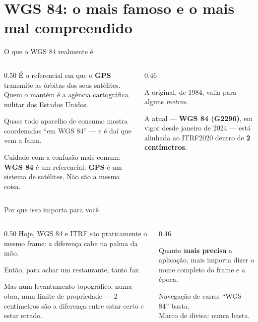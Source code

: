 \documentclass[aspectratio=169,11pt]{beamer}
\newcommand{\bnum}[1]{\textbf{\textcolor{mTeal}{#1}}}
\begin{document}
\section{WGS 84: o mais famoso e o mais mal compreendido}

\begin{frame}{O que o WGS 84 realmente é}
  \begin{columns}[T]
    \begin{column}{0.50\textwidth}
      É o referencial em que o \bnum{GPS} transmite as órbitas dos seus satélites. Quem o
      mantém é a agência cartográfica militar dos Estados Unidos.
      \medskip

      Quase todo aparelho de consumo mostra coordenadas ``em WGS 84'' --- e é daí que vem a
      fama.
      \medskip

      {\small Cuidado com a confusão mais comum: \textbf{WGS 84} é um referencial;
      \textbf{GPS} é um sistema de satélites. Não são a mesma coisa.}
    \end{column}
    \begin{column}{0.46\textwidth}
      \begin{cuidado}[title={Sete realizações em 30 anos}]
        A original, de 1984, valia para alguns \emph{metros}.
        \medskip

        A atual --- \bnum{WGS 84 (G2296)}, em vigor desde janeiro de 2024 --- está alinhada
        ao ITRF2020 dentro de \bnum{2 centímetros}.
      \end{cuidado}
    \end{column}
  \end{columns}
\end{frame}

\begin{frame}{Por que isso importa para você}
  \begin{columns}[T]
    \begin{column}{0.50\textwidth}
      Hoje, WGS 84 e ITRF são praticamente o mesmo frame: a diferença cabe na palma da mão.
      \medskip

      Então, para achar um restaurante, tanto faz.
      \medskip

      Mas num levantamento topográfico, numa obra, num limite de propriedade --- 2
      centímetros \alert{são} a diferença entre estar certo e estar errado.
    \end{column}
    \begin{column}{0.46\textwidth}
      \begin{ideia}[title={A regra prática}]
        Quanto \bnum{mais precisa} a aplicação, mais importa dizer o nome completo do frame
        e a época.
        \medskip

        Navegação de carro: ``WGS 84'' basta.\\[3pt]
        Marco de divisa: nunca basta.
      \end{ideia}
    \end{column}
  \end{columns}
\end{frame}
\end{document}
